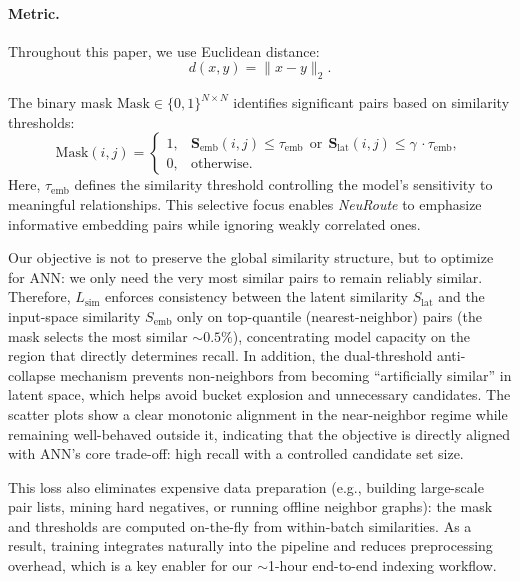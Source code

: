 \documentclass[sigconf, nonacm]{acmart}
\begin{document}
\paragraph{Metric.}
Throughout this paper, we use Euclidean distance:
\begin{equation}
d(x,y)=\|x-y\|_2.
\end{equation}


The binary mask $\mathrm{Mask} \in \{0,1\}^{N \times N}$ identifies significant pairs based on similarity thresholds:
\begin{equation}
\label{equation8}
\mathrm{Mask}(i,j)=
\begin{cases}
1, & \mathbf{S}_{\text{emb}}(i,j)\le \tau_{\text{emb}}
\ \ \text{or}\ \
\mathbf{S}_{\text{lat}}(i,j)\le \gamma\,\cdot \tau_{\text{emb}}, \\[4pt]
0, & \text{otherwise.}
\end{cases}
\end{equation}
Here, $\tau_{\text{emb}}$ defines the similarity threshold controlling the model’s sensitivity to meaningful relationships. This selective focus enables \textit{NeuRoute} to emphasize informative embedding pairs while ignoring weakly correlated ones.


Our objective is not to preserve the global similarity structure, but to optimize for ANN: we only need the very most similar pairs to remain reliably similar. Therefore, $L_{\text{sim}}$ enforces consistency between the latent similarity $S_{\text{lat}}$ and the input-space similarity $S_{\text{emb}}$ only on top-quantile (nearest-neighbor) pairs (the mask selects the most similar $\sim 0.5\%$), concentrating model capacity on the region that directly determines recall. In addition, the dual-threshold anti-collapse mechanism prevents non-neighbors from becoming ``artificially similar'' in latent space, which helps avoid bucket explosion and unnecessary candidates. The scatter plots show a clear monotonic alignment in the near-neighbor regime while remaining well-behaved outside it, indicating that the objective is directly aligned with ANN's core trade-off: high recall with a controlled candidate set size.

This loss also eliminates expensive data preparation (e.g., building large-scale pair lists, mining hard negatives, or running offline neighbor graphs): the mask and thresholds are computed on-the-fly from within-batch similarities. As a result, training integrates naturally into the pipeline and reduces preprocessing overhead, which is a key enabler for our $\sim$1-hour end-to-end indexing workflow.
\end{document}
